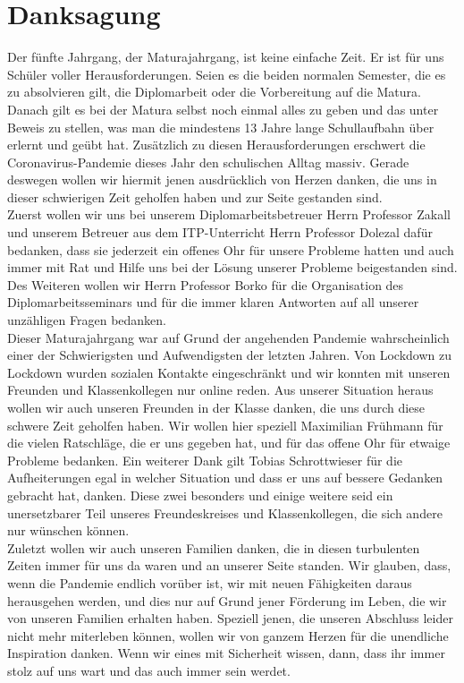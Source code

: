 \chapter{Danksagung} 
Der fünfte Jahrgang, der Maturajahrgang, ist keine einfache Zeit. Er ist für uns Schüler voller Herausforderungen. Seien es die beiden normalen Semester, die es zu absolvieren gilt, die Diplomarbeit oder die Vorbereitung auf die Matura. Danach gilt es bei der Matura selbst noch einmal alles zu geben und das unter Beweis zu stellen, was man die mindestens 13 Jahre lange Schullaufbahn über erlernt und geübt hat. Zusätzlich zu diesen Herausforderungen erschwert die Coronavirus-Pandemie dieses Jahr den schulischen Alltag massiv. Gerade deswegen wollen wir hiermit jenen ausdrücklich von Herzen danken, die uns in dieser schwierigen Zeit geholfen haben und zur Seite gestanden sind.\\

Zuerst wollen wir uns bei unserem Diplomarbeitsbetreuer Herrn Professor Zakall und unserem Betreuer aus dem ITP-Unterricht Herrn Professor Dolezal dafür bedanken, dass sie jederzeit ein offenes Ohr für unsere Probleme hatten und auch immer mit Rat und Hilfe uns bei der Lösung unserer Probleme beigestanden sind. Des Weiteren wollen wir Herrn Professor Borko für die Organisation des Diplomarbeitsseminars und für die immer klaren Antworten auf all unserer unzähligen Fragen bedanken.\\

Dieser Maturajahrgang war auf Grund der angehenden Pandemie wahrscheinlich einer der Schwierigsten und Aufwendigsten der letzten Jahren. Von Lockdown zu Lockdown wurden sozialen Kontakte eingeschränkt und wir konnten mit unseren Freunden und Klassenkollegen nur online reden. Aus unserer Situation heraus wollen wir auch unseren Freunden in der Klasse danken, die uns durch diese schwere Zeit geholfen haben. Wir wollen hier speziell Maximilian Frühmann für die vielen Ratschläge, die er uns gegeben hat, und für das offene Ohr für etwaige Probleme bedanken. Ein weiterer Dank gilt Tobias Schrottwieser für die Aufheiterungen egal in welcher Situation und dass er uns auf bessere Gedanken gebracht hat, danken. Diese zwei besonders und einige weitere seid ein unersetzbarer Teil unseres Freundeskreises und Klassenkollegen, die sich andere nur wünschen können.\\

Zuletzt wollen wir auch unseren Familien danken, die in diesen turbulenten Zeiten immer für uns da waren und an unserer Seite standen. Wir glauben, dass, wenn die Pandemie endlich vorüber ist, wir mit neuen Fähigkeiten daraus herausgehen werden, und dies nur auf Grund jener Förderung im Leben, die wir von unseren Familien erhalten haben. 
Speziell jenen, die unseren Abschluss leider nicht mehr miterleben können, wollen wir von ganzem Herzen für die unendliche Inspiration danken. Wenn wir eines mit Sicherheit wissen, dann, dass ihr immer stolz auf uns wart und das auch immer sein werdet.